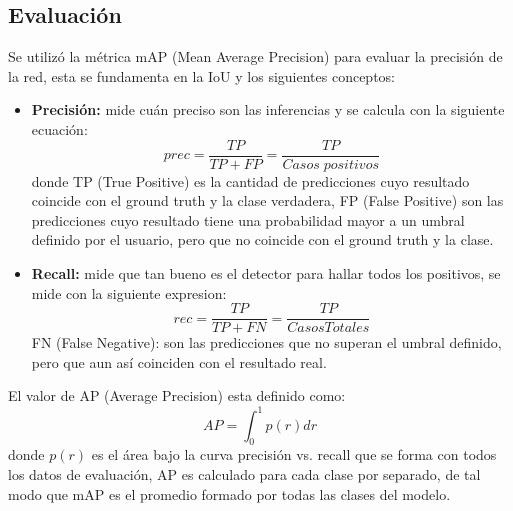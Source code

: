 \subsection{Evaluación}
Se utilizó la métrica mAP (Mean Average Precision) para evaluar la precisión de la red, esta se fundamenta en la IoU y los siguientes conceptos:
\begin{itemize}
    \item \textbf{Precisión:} mide cuán preciso son las inferencias y se calcula con la siguiente ecuación:
    \begin{equation}
        prec = \frac{TP}{TP + FP} = \frac{TP}{Casos\; positivos}
    \end{equation}
    donde TP (True Positive) es la cantidad de predicciones cuyo resultado coincide con el ground truth y la clase verdadera, FP (False Positive) son las predicciones cuyo resultado tiene una probabilidad mayor a un umbral definido por el usuario, pero que no coincide con el ground truth y la clase.
    \item \textbf{Recall:} mide que tan bueno es el detector para hallar todos los positivos, se mide con la siguiente expresion:
    \begin{equation}
        rec = \frac{TP}{TP + FN} = \frac{TP}{Casos Totales}
    \end{equation}
    FN (False Negative): son las predicciones que no superan el umbral definido, pero que aun así coinciden con el resultado real.
\end{itemize}
El valor de AP (Average Precision) esta definido como:
\begin{equation}
    AP = \int_{0}^{1} p(r)dr
\end{equation}
donde $p(r)$ es el área bajo la curva precisión vs. recall que se forma con todos los datos de evaluación, AP es calculado para cada clase por separado, de tal modo que mAP es el promedio formado por todas las clases del modelo. 

